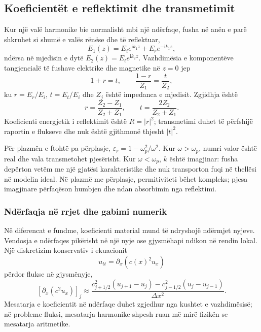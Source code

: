 \subsection{Koeficientët e reflektimit dhe transmetimit}
Kur një valë harmonike bie normalisht mbi një ndërfaqe, fusha në anën e parë shkruhet si shumë e valës rënëse dhe të reflektuar,
\begin{equation}
 E_1(z)=E_i e^{\mathrm{i}k_1z}+E_r e^{-\mathrm{i}k_1z},
\end{equation}
ndërsa në mjedisin e dytë $E_2(z)=E_t e^{\mathrm{i}k_2z}$. Vazhdimësia e komponentëve tangjencialë të fushave elektrike dhe magnetike në $z=0$ jep
\begin{equation}
 1+r=t,
 \qquad
 \frac{1-r}{Z_1}=\frac{t}{Z_2},
\end{equation}
ku $r=E_r/E_i$, $t=E_t/E_i$ dhe $Z_j$ është impedanca e mjedisit. Zgjidhja është
\begin{equation}
 r=\frac{Z_2-Z_1}{Z_2+Z_1},
 \qquad
 t=\frac{2Z_2}{Z_2+Z_1}.
\end{equation}
Koeficienti energjetik i reflektimit është $R=|r|^2$; transmetimi duhet të përfshijë raportin e flukseve dhe nuk është gjithmonë thjesht $|t|^2$.

Për plazmën e ftohtë pa përplasje, $\varepsilon_r=1-\omega_p^2/\omega^2$. Kur $\omega>\omega_p$, numri valor është real dhe vala transmetohet pjesërisht. Kur $\omega<\omega_p$, $k$ është imagjinar: fusha depërton vetëm me një gjatësi karakteristike dhe nuk transporton fuqi në thellësi në modelin ideal. Në plazmë me përplasje, permitiviteti bëhet kompleks; pjesa imagjinare përfaqëson humbjen dhe ndan absorbimin nga reflektimi.

\subsubsection{Ndërfaqja në rrjet dhe gabimi numerik}
Në diferencat e fundme, koeficienti material mund të ndryshojë ndërmjet nyjeve. Vendosja e ndërfaqes pikërisht në një nyje ose gjysmëhapi ndikon në rendin lokal. Një diskretizim konservativ i ekuacionit
\begin{equation}
 u_{tt}=\partial_x\left(c(x)^2u_x\right)
\end{equation}
përdor flukse në gjysmënyje,
\begin{equation}
 \left[\partial_x(c^2u_x)\right]_j
 \approx\frac{c_{j+1/2}^2(u_{j+1}-u_j)-c_{j-1/2}^2(u_j-u_{j-1})}{\Delta x^2}.
\end{equation}
Mesatarja e koeficientit në ndërfaqe duhet zgjedhur nga kushtet e vazhdimësisë; në probleme fluksi, mesatarja harmonike shpesh ruan më mirë fizikën se mesatarja aritmetike.

